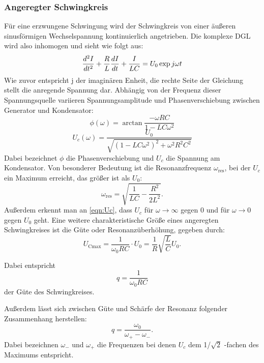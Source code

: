 \subsubsection{Angeregter Schwingkreis}
Für eine erzwungene Schwingung wird der Schwingkreis von einer äußeren
sinusförmigen
Wechselspannung kontinuierlich angetrieben.
Die komplexe DGL wird also inhomogen und sieht wie folgt aus:
\begin{equation}
  \centering
  \frac{d^2I}{dt^2} + \frac{R}{L} \frac{dI}{dt}
  + \frac{I}{LC} = U_0\exp{j\omega t}
  \label{eqn:Iinh}
\end{equation}
Wie zuvor entspricht j der imaginären Enheit, die rechte Seite der Gleichung
stellt die anregende Spannung dar.
Abhängig von der Frequenz dieser
Spannungsquelle variieren Spannungsamplitude und Phasenverschiebung zwischen
Generator und Kondensator:
\begin{equation}
  \phi(\omega) = \arctan{\frac{-\omega R C}{1 - LC\omega^2}}
  \label{eqn:phi}
\end{equation}
\begin{equation}
  U_c(\omega) = \frac{U_0}{\sqrt{(1 - LC\omega^2)^2 + \omega^2R^2C^2}}
  \label{eqn:Uc}
\end{equation}
Dabei bezeichnet $\phi$ die Phasenverschiebung und $U_c$ die Spannung am
Kondensator.
Von besonderer Bedeutung ist die Resonanzfrequenz $\omega_\text{res}$, bei der
$U_c$ ein Maximum erreicht, das größer ist als $U_0$:
\begin{equation}
  \omega_\text{res} = \sqrt{\frac{1}{LC} - \frac{R^2}{2L^2}}.
  \label{eqn:wres}
\end{equation}
Außerdem erkennt man an \ref{eqn:Uc}, dass $U_c$ für
$\omega \rightarrow \infty$ gegen 0 und für $\omega \rightarrow 0$ gegen $U_0$
geht.
Eine weitere charakteristische Größe eines angeregten Schwingkreises ist die
Güte oder Resonanzüberhöhung, gegeben durch:
\begin{equation}
  U_\text{Cmax} = \frac{1}{\omega_0 R C} \cdot U_0 = \frac{1}{R}\sqrt{\frac{L}{C}}U_0.
  \label{eqn:güte1}
\end{equation}

Dabei entspricht $$q = \frac{1}{\omega_0 R C}$$ der Güte des Schwingkreises.

Außerdem lässt sich zwischen Güte und Schärfe der Resonanz folgender
Zusammenhang herstellen:
\begin{equation}
  q = \frac{\omega_0}{\omega_+ - \omega_-}.
  \label{eqn:güte2}
\end{equation}
Dabei bezeichnen $\omega_-$ und $\omega_+$ die Frequenzen bei denen $U_c$ dem
1/$\sqrt{2}$ -fachen des Maximums entspricht.
